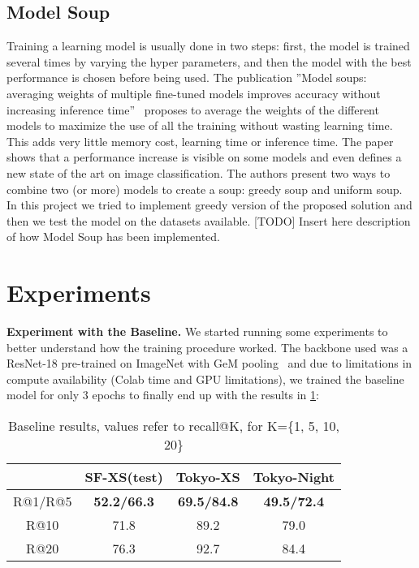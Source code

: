 \documentclass[10pt,twocolumn,letterpaper]{article}
\begin{document}
\subsection{Model Soup}
Training a learning model is usually done in two steps: first, the model is trained several times by varying the hyper parameters, and then the model with the best performance is chosen before being used. 
The publication ”Model soups: averaging weights of multiple fine-tuned models improves accuracy without increasing inference time”~\cite{modelsoup} proposes to average the weights of the different models to maximize the use of all the training without wasting learning time. This adds very little memory cost, learning time or inference time. The paper shows that a performance increase is visible on some models and even defines a new state of the art on image classification. The authors present two ways to combine two (or more) models to create a soup: greedy soup and uniform soup. In this project we tried to implement greedy version of the proposed solution and then we test the model on the datasets available.
[TODO] Insert here description of how Model Soup has been implemented.

\section{Experiments}
\textbf{Experiment with the Baseline.}
We started running some experiments to better understand how the training procedure worked. The backbone used was a ResNet-18 pre-trained on ImageNet with GeM pooling~\cite{finetuning} and due to limitations in compute availability (\eg Colab time and GPU limitations), we trained the baseline model for only 3 epochs to finally end up with the results in \cref{tab:baseline}:


\begin{table}[htp]
  \centering
  \begin{tabular}{@{}cccc@{}}
    \toprule
    & SF-XS(test) & Tokyo-XS & Tokyo-Night\\
    \midrule
    R@1/R@5 & \textbf{52.2/66.3} & \textbf{69.5/84.8} & \textbf{49.5/72.4} \\
    R@10 & 71.8 & 89.2 & 79.0\\
    R@20 & 76.3 & 92.7 & 84.4\\
    \bottomrule
  \end{tabular}
  \caption{Baseline results, values refer to recall@K, for K=\{1, 5, 10, 20\}}
  \label{tab:baseline}
\end{table}
\end{document}
